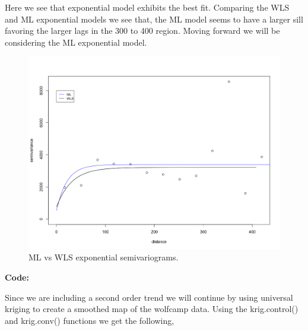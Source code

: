 \documentclass[12pt]{article}
\makeatletter
\theoremstyle{homework}
\newenvironment{exercise}[1]
{\def\@currentlabel{#1}\exercisecore}
{\endexercisecore}
\makeatother
\begin{document}
\begin{exercise}{2}
Here we see that exponential model exhibits the best fit. Comparing the WLS and ML exponential models we see that, the ML model seems to 
have a larger sill favoring the larger lags in the 300 to 400 region. Moving forward we will be considering the ML exponential model. 

\begin{figure}[H]
  \begin{center}
    \caption{ML vs WLS exponential semivariograms.}
  \includegraphics[width = \textwidth]{Rplot07.png}
  \end{center}
\end{figure}

\textbf{Code:}
\begin{center}

\end{center}

Since we are including a second order trend we will continue by using universal kriging to create a smoothed map of 
the wolfcamp data. Using the krig.control() and krig.conv() functions we get the following, 


\end{exercise}
\end{document}
